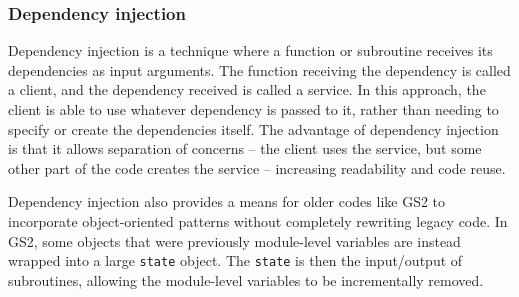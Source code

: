 \subsubsection{Dependency injection}\label{sec:dependency_injection}

Dependency injection is a technique where a function or subroutine receives its
dependencies as input arguments.
The function receiving the dependency is called a client, and the dependency
received is called a service.
In this approach, the client is able to use whatever dependency is passed to it, 
rather than needing to specify or create the dependencies itself.
The advantage of dependency injection is that it allows separation of concerns --
the client uses the service, but some other part of the code creates the service --
increasing readability and code reuse.

Dependency injection also provides a means for older codes like GS2 to
incorporate object-oriented patterns without completely rewriting legacy code.
In GS2, some objects that were previously module-level variables are instead
wrapped into a large \texttt{state} object.
The \texttt{state} is then the input/output of subroutines, allowing the
module-level variables to be incrementally removed.
